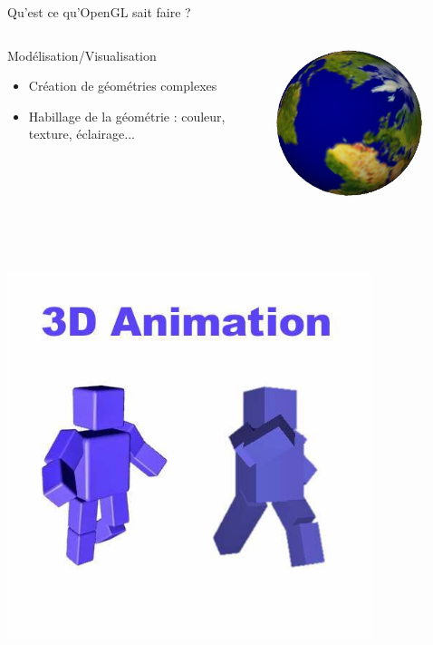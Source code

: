 \documentclass{beamer}
\begin{document}
\begin{frame}{Qu'est ce qu'OpenGL sait faire ?}
	\begin{columns}
		\begin{column}{0.55\textwidth}
			\begin{block}{Modélisation/Visualisation}
				\begin{itemize}
					\item Création de géométries complexes
					\item Habillage de la géométrie : couleur, texture, éclairage...
				\end{itemize}
			\end{block}
		\end{column}
		\begin{column}{0.4\textwidth}
			\centering
			\includegraphics[width=0.8\textwidth]{img/model_earth}
		\end{column}
	\end{columns}
	~\\
	\pause
	\begin{columns}
		\begin{column}{0.4\textwidth}
			\centering
			\includegraphics[width=0.8\textwidth]{img/animation}

\end{column}
\end{columns}
\end{frame}
\end{document}

